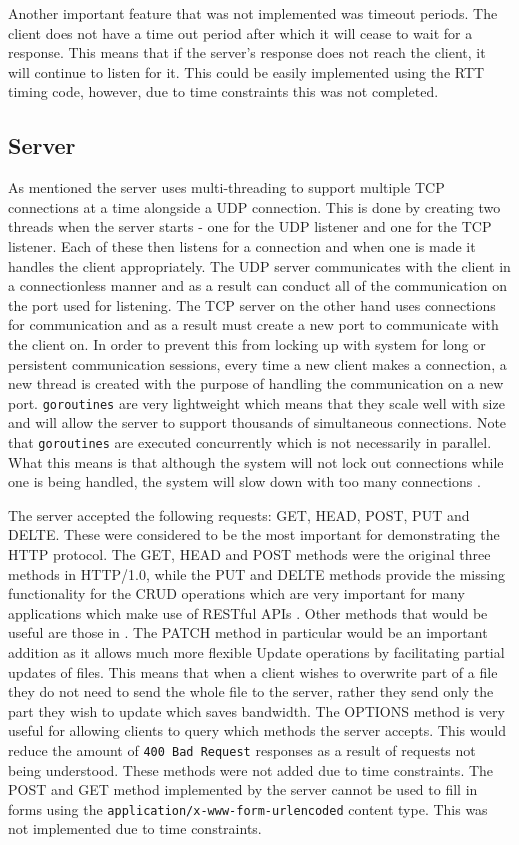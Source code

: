 \documentclass[10pt,twocolumn]{witseiepaper}
\begin{document}
	Another important feature that was not implemented was timeout periods. The client does not have a time out period after which it will cease to wait for a response. This means that if the server's response does not reach the client, it will continue to listen for it. This could be easily implemented using the RTT timing code, however, due to time constraints this was not completed.

	\subsection{Server}

	As mentioned the server uses multi-threading to support multiple TCP connections at a time alongside a UDP connection. This is done by creating two threads when the server starts - one for the UDP listener and one for the TCP listener. Each of these then listens for a connection and when one is made it handles the client appropriately. The UDP server communicates with the client in a connectionless manner and as a result can conduct all of the communication on the port used for listening. The TCP server on the other hand uses connections for communication and as a result must create a new port to communicate with the client on. In order to prevent this from locking up with system for long or persistent communication sessions, every time a new client makes a connection, a new thread is created with the purpose of handling the communication on a new port. \texttt{goroutines} are very lightweight which means that they scale well with size and will allow the server to support thousands of simultaneous connections. Note that \texttt{goroutines} are executed concurrently which is not necessarily in parallel. What this means is that although the system will not lock out connections while one is being handled, the system will slow down with too many connections \cite{doxsey}.

	The server accepted the following requests: GET, HEAD, POST, PUT and DELTE. These were considered to be the most important for demonstrating the HTTP protocol. The GET, HEAD and POST methods were the original three methods in HTTP/1.0, while the PUT and DELTE methods provide the missing functionality for the CRUD operations which are very important for many applications which make use of RESTful APIs \cite{guinard}. Other methods that would be useful are those in . The PATCH method in particular would be an important addition as it allows much more flexible Update operations by facilitating partial updates of files. This means that when a client wishes to overwrite part of a file they do not need to send the whole file to the server, rather they send only the part they wish to update which saves bandwidth. The OPTIONS method is very useful for allowing clients to query which methods the server accepts. This would reduce the amount of \texttt{400 Bad Request} responses as a result of requests not being understood. These methods were not added due to time constraints. The POST and GET method implemented by the server cannot be used to fill in forms using the \texttt{application/x-www-form-urlencoded} content type. This was not implemented due to time constraints.
\end{document}
